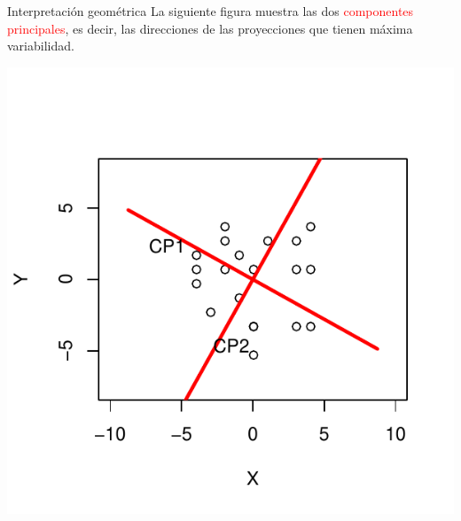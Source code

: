 \documentclass[
  ignorenonframetext,
]{beamer}
\newcommand\red[1]{\textcolor{red}{#1}}
\begin{document}
\begin{frame}{Interpretación geométrica}
\label{interpretaciuxf3n-geomuxe9trica}
La siguiente figura muestra las dos \red{componentes principales}, es
decir, las direcciones de las proyecciones que tienen máxima
variabilidad.

\begin{center}\includegraphics{AnalisisComponentesPrincipales_fusion_files/figure-beamer/inter2-1} \end{center}
\end{frame}
\end{document}
